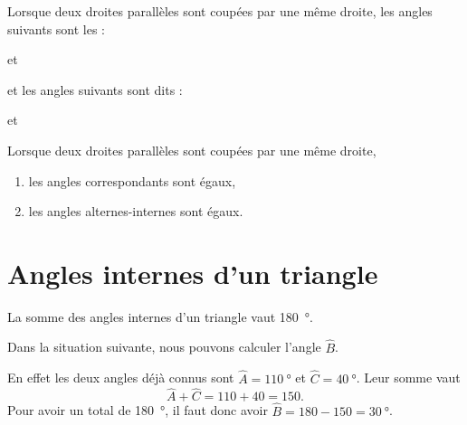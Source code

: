 

\begin{definition}
    Lorsque deux droites parallèles sont coupées par une même droite, les angles suivants sont les  :

\begin{center}
   
   \hfill et\hfill
   
\end{center}

et les angles suivants sont dits  :

\begin{center}
   
   \hfill et\hfill
   
\end{center}

\end{definition}

\begin{propriete}
    Lorsque deux droites parallèles sont coupées par une même droite,
    \begin{enumerate}
        \item
            les angles correspondants sont égaux,
        \item
            les angles alternes-internes sont égaux.
    \end{enumerate}
\end{propriete}

\section{Angles internes d'un triangle}



\begin{theorem}
    La somme des angles internes d'un triangle vaut \SI{180}{\degree}.
\end{theorem}

\begin{example}
    Dans la situation suivante, nous pouvons calculer l'angle \( \hat B\).

    \begin{center}
        
    \end{center}
    
    En effet les deux angles déjà connus sont \( \hat A=\SI{110}{\degree}\) et \( \hat C=\SI{40}{\degree}\). Leur somme vaut
    \begin{equation}
        \hat A+\hat C=110+40=150.
    \end{equation}
    Pour avoir un total de \SI{180}{\degree}, il faut donc avoir \( \hat B=180-150=\SI{30}{\degree}\).

\end{example}

